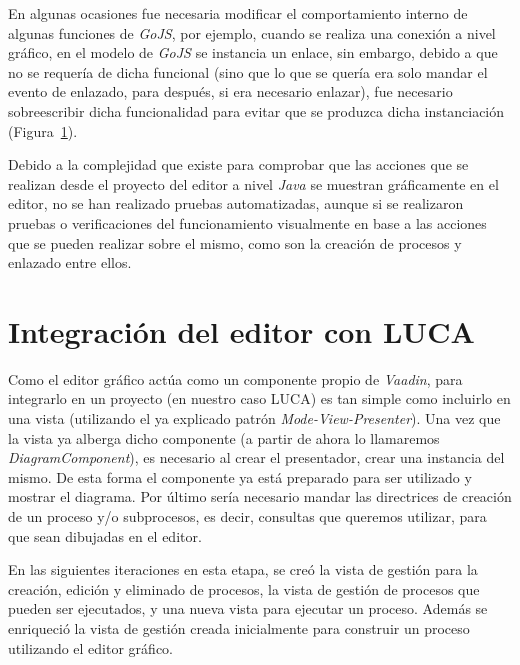 
En algunas ocasiones fue necesaria  modificar el comportamiento interno de algunas funciones de \emph{GoJS}, por ejemplo, cuando se realiza una conexión a nivel gráfico, en el modelo de \emph{GoJS} se instancia un enlace, sin embargo, debido a que no se requería de dicha funcional (sino que lo que se quería era solo mandar el evento de enlazado, para después, si era necesario enlazar), fue necesario sobreescribir dicha funcionalidad para evitar que se produzca dicha instanciación (Figura~\ref{}).


Debido a la complejidad que existe para comprobar que las acciones que se realizan desde el proyecto del editor a nivel \emph{Java} se muestran gráficamente en el editor, no se han realizado pruebas automatizadas, aunque si se realizaron pruebas o verificaciones del funcionamiento visualmente en base a las acciones que se pueden realizar sobre el mismo, como son la creación de procesos y enlazado entre ellos.


\section{Integración del editor con LUCA}

Como el editor gráfico actúa como un componente propio de \emph{Vaadin}, para integrarlo en un proyecto (en nuestro caso LUCA) es tan simple como incluirlo en una vista (utilizando el ya explicado patrón \emph{Mode-View-Presenter}). Una vez que la vista ya alberga dicho componente (a partir de ahora lo llamaremos \emph{DiagramComponent}), es necesario al crear el presentador, crear una instancia del mismo. De esta forma el componente ya está preparado para ser utilizado y mostrar el diagrama. Por último sería necesario mandar las directrices de creación de un proceso y/o subprocesos, es decir, consultas que queremos utilizar, para que sean dibujadas en el editor.

En las siguientes iteraciones en esta etapa, se creó la vista de gestión para la creación, edición y eliminado de procesos, la vista de gestión de procesos que pueden ser ejecutados, y una nueva vista para ejecutar un proceso. Además se enriqueció la vista de gestión creada inicialmente para construir un proceso utilizando el editor gráfico.

